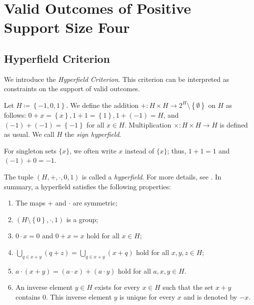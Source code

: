 \chapter{Valid Outcomes of Positive Support Size Four}

\section{Hyperfield Criterion}

We introduce the \emph{Hyperfield Criterion}. This criterion can be interpreted as constraints on the support of valid outcomes.

\begin{definition}
    Let \( H \coloneqq \left\{ -1, 0, 1 \right\} \). We define the addition \( + : H \times H \to 2^H \setminus \left\{ \emptyset \right\} \) on \( H \) as follows: \( 0 + x = \left\{ x \right\},  1 + 1 = \left\{ 1 \right\},1 + (-1) = H \), and \( (-1) + (-1) = \left\{ -1 \right\} \) for all \( x \in H \).
    Multiplication \( \times : H \times H \to H \) is defined as usual. We call \( H \) the \emph{sign hyperfield}.
\end{definition}

For singleton sets \( \{ x \} \), we often write \( x \) instead of \( \{ x \} \); thus, \( 1 + 1 = 1 \) and \( (-1) + 0 = -1 \).

\begin{remark}
    The tuple \( (H, + , \cdot, 0, 1) \) is called a \emph{hyperfield}. For more details, see \cite{baker2018matroids}. In summary, a hyperfield satisfies the following properties:
    \begin{enumerate}
        \item  The maps \( + \) and \( \cdot \) are symmetric;
        \item \( (H \setminus \left\{ 0 \right\}, \cdot, 1) \) is a group;
        \item \( 0 \cdot x = 0 \) and \( 0 + x = x \) hold for all \( x \in H \);
        \item \( \bigcup_{q \in x+y}(q + z) = \bigcup_{q \in x + y}(x + q) \) hold for all \( x,y,z \in H \);
        \item \( a \cdot (x + y) = (a \cdot x) + (a \cdot y) \) hold for all \( a,x,y \in H \).
        \item An inverse element \( y  \in H\) exists for every \( x \in H\) such that the set \( x + y \) contains \( 0 \). This inverse element \( y \) is unique for every \( x \) and is denoted by \( -x \).
    \end{enumerate}
\end{remark}


